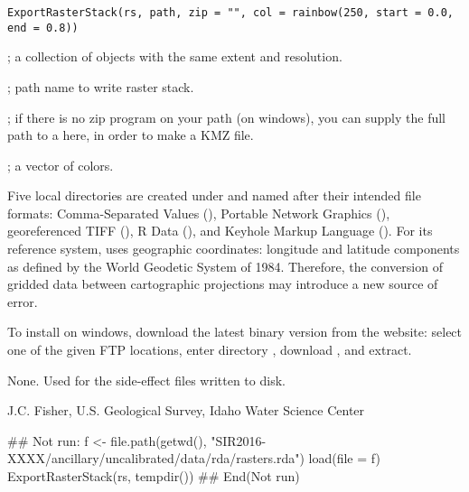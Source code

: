 \documentclass[a4paper]{book}
\begin{document}
%
\begin{Usage}
\begin{verbatim}
ExportRasterStack(rs, path, zip = "", col = rainbow(250, start = 0.0, end = 0.8))
\end{verbatim}
\end{Usage}
%
\begin{Arguments}
\begin{ldescription}
\item[\code{rs}] ; a collection of  objects with the same extent and resolution.
\item[\code{path}] ; path name to write raster stack.
\item[\code{zip}] ; if there is no zip program on your path (on windows), you can supply the full path to a  here, in order to make a KMZ file.
\item[\code{col}] ; a vector of colors.
\end{ldescription}
\end{Arguments}
%
\begin{Details}\relax
Five local directories are created under  and named after their intended file formats:
Comma-Separated Values (),
Portable Network Graphics (),
georeferenced TIFF (),
R Data (),
and Keyhole Markup Language ().
For its reference system,  uses geographic coordinates: longitude and latitude components as defined by the World Geodetic System of 1984.
Therefore, the conversion of gridded data between cartographic projections may introduce a new source of error.

To install  on windows, download the latest binary version from the  website:
select one of the given FTP locations, enter directory , download , and extract.
\end{Details}
%
\begin{Value}
None. Used for the side-effect files written to disk.
\end{Value}
%
\begin{Author}\relax
J.C. Fisher, U.S. Geological Survey, Idaho Water Science Center
\end{Author}
%
\begin{SeeAlso}\relax
{}
\end{SeeAlso}
%
\begin{Examples}
\begin{ExampleCode}
## Not run: 
f <- file.path(getwd(), "SIR2016-XXXX/ancillary/uncalibrated/data/rda/rasters.rda")
load(file = f)
ExportRasterStack(rs, tempdir())
## End(Not run)
\end{ExampleCode}
\end{Examples}
\end{document}
